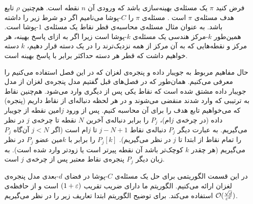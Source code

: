 فرض کنید $\pi$ یک مسئله‌ی بهینه‌سازی باشد که ورودی آن $n$ نقطه است. هم‌چنین $\rho$ تابع هدف مسئله‌ی $\pi$ است . مسئله‌ی $\pi$ را $C$-پوشا می‌نامیم اگر دو شرط زیر را داشته باشد.
به عنوان مثال مسئله‌ی محاسبه‌ی قطر نقاط یک مسئله‌ی $1$-پوشا است. همین‌طور $k$-مرکز هندسی یک مسئله‌ی $k$-پوشا است زیرا اگر به ازای پاسخ بهینه، هر مرکز و نقطه‌هایی که به آن مرکز از همه نزدیک‌ترند را در یک دسته قرار دهیم، $k$ دسته خواهیم داشت که قطر هر دسته حداکثر برابر با پاسخ بهینه است.

حال مفاهیم مربوط به جویبار داده و پنجره‌ی لغزان که در این فصل استفاده می‌کنیم را معرفی می‌کنیم. همان‌طور که در فصل‌های قبل گفتیم مدل پنجره‌ی لغزان از مدل جویبار داده مشتق شده است که نقاط یکی پس از دیگری وارد می‌شود. هم‌چنین نقاط به ترتیبی که وارد شدند منقضی می‌شوند و در هر لحظه دنباله‌ای از نقاط داریم (پنجره) که می‌خواهیم تابع هدف را برای آن محاسبه کنیم. پس از ورود $j$امین نقطه از جویبار داده (در چرخه‌ی $j$ام)، $P_j$ را برابر دنباله‌ی آخرین $N$ نقطه تا چرخه‌ی $j$ در نظر می‌گیریم. به عبارت دیگر $P_j$ دنباله‌ی نقاط 
$j-N+1$
 تا $j$ام است (اگر $ j < N$ آن‌گاه $P_j$ را تمام نقاط از ابتدا تا $j$ در نظر می‌گیریم). $P_j[k]$ را برابر با $k$مین عضو $P_j$ در نظر می‌گیریم (هر چقدر $k$ کوچک‌تر باشد آن نقطه پیرتر است یا زودتر وارد شده است). به زبان دیگر $P_j$ پنجره‌ی نقاط معتبر پس از چرخه‌ی $j$ است.

 در این قسمت الگوریتمی برای حل یک مسئله‌ی $C$-پوشا در فضای $d$-بعدی مدل پنجره‌ی لغزان ارائه می‌کنیم. الگوریتم ما دارای ضریب تقریب $(1+\varepsilon)$ است و از حافظه‌ی $\mathcal{O}(\frac{\sqrt{d}}{\varepsilon^d})$ استفاده می‌کند. برای توضیح الگوریتم ابتدا تعاریف زیر را در نظر می‌گیریم.
 
